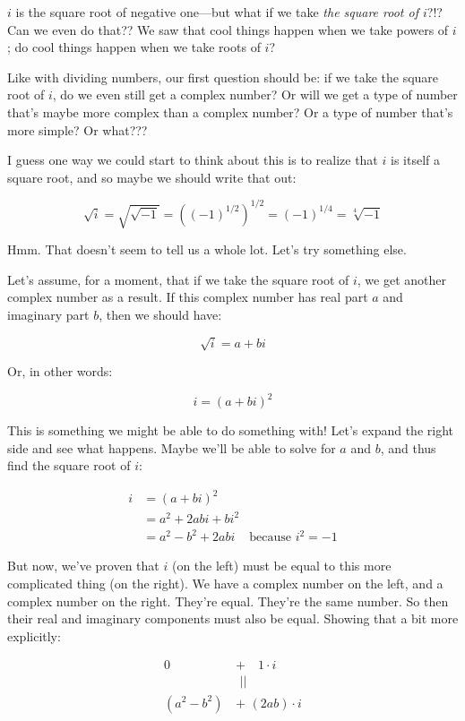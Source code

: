 \documentclass[
]{article}
\begin{document}
\(i\) is the square root of negative one---but what if we take \emph{the
square root of \(i\)}?!? Can we even do that?? We saw that cool things
happen when we take powers of \(i\); do cool things happen when we take
roots of \(i\)?

Like with dividing numbers, our first question should be: if we take the
square root of \(i\), do we even still get a complex number? Or will we
get a type of number that's maybe more complex than a complex number? Or
a type of number that's more simple? Or what???

I guess one way we could start to think about this is to realize that
\(i\) is itself a square root, and so maybe we should write that out:

\[\sqrt{i} = \sqrt{\sqrt{-1}} = \left((-1)^{1/2}\right)^{1/2} = (-1)^{1/4} = \sqrt[4]{-1}\]

Hmm. That doesn't seem to tell us a whole lot. Let's try something else.

Let's assume, for a moment, that if we take the square root of \(i\), we
get another complex number as a result. If this complex number has real
part \(a\) and imaginary part \(b\), then we should have:

\[\sqrt{i} = a + bi\]

Or, in other words:

\[i = (a+bi)^2\]

This is something we might be able to do something with! Let's expand
the right side and see what happens. Maybe we'll be able to solve for
\(a\) and \(b\), and thus find the square root of \(i\):

\[
\begin{align*}
i &= (a+bi)^2 \\
 &= a^2 + 2abi + bi^2 \\
 &= a^2 - b^2 + 2abi &\text{because } i^2=-1
 \end{align*}
 \]

But now, we've proven that \(i\) (on the left) must be equal to this
more complicated thing (on the right). We have a complex number on the
left, and a complex number on the right. They're equal. They're the same
number. So then their real and imaginary components must also be equal.
Showing that a bit more explicitly:

\[
\begin{align*}
0 \quad &+ \quad1\cdot i \\
&\,\,|| \\
(a^2 - b^2) \,&+\,\,(2ab)\cdot i
\end{align*}
\]
\end{document}
